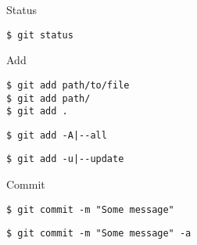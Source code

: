 \documentclass[11pt]{beamer}
\begin{document}
\begin{frame}[fragile]{Status}
    \begin{lstlisting}
$ git status    
    \end{lstlisting}
\end{frame}

\begin{frame}[fragile]{Add}
    \begin{lstlisting}
$ git add path/to/file
$ git add path/
$ git add .
    \end{lstlisting}
    \pause
    \begin{lstlisting}
$ git add -A|--all
    \end{lstlisting}
    \pause
    \begin{lstlisting}
$ git add -u|--update
    \end{lstlisting}
\end{frame}

\begin{frame}[fragile]{Commit}
    \begin{lstlisting}
$ git commit -m "Some message"
    \end{lstlisting}
    \pause
    \begin{lstlisting}
$ git commit -m "Some message" -a
    \end{lstlisting}
\end{frame}
\end{document}

